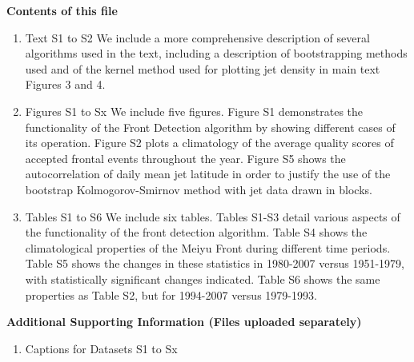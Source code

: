 \documentclass[draft,grl]{agutexSI}
\begin{document}
\begin{article}

%
%


\noindent\textbf{Contents of this file}
\begin{enumerate}
\item Text S1 to S2
We include a more comprehensive description of several algorithms used in the text, including a description of bootstrapping methods used and of the kernel method used for plotting jet density in main text Figures 3 and 4.

\item Figures S1 to Sx
We include five figures. Figure S1 demonstrates the functionality of the Front Detection algorithm by showing different cases of its operation. Figure S2 plots a climatology of the average quality scores of accepted frontal events throughout the year. Figure S5 shows the autocorrelation of daily mean jet latitude in order to justify the use of the bootstrap Kolmogorov-Smirnov method with jet data drawn in blocks.

\item Tables S1 to S6
We include six tables. Tables S1-S3 detail various aspects of the functionality of the front detection algorithm. Table S4 shows the climatological properties of the Meiyu Front during different time periods. Table S5 shows the changes in these statistics in 1980-2007 versus 1951-1979, with statistically significant changes indicated. Table S6 shows the same properties as Table S2, but for 1994-2007 versus 1979-1993.

\end{enumerate}
\noindent\textbf{Additional Supporting Information (Files uploaded separately)}
\begin{enumerate}
\item Captions for Datasets S1 to Sx
\end{enumerate}



\end{article}
\end{document}

